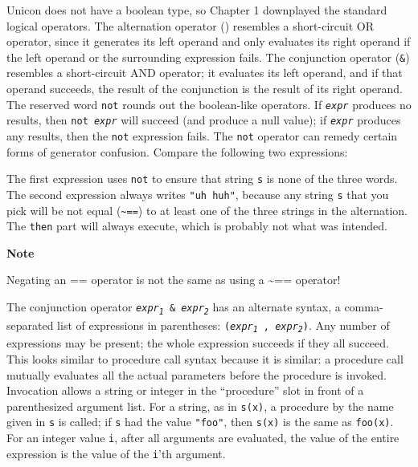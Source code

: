Unicon does not have a boolean type, so
Chapter 1 downplayed the standard logical operators. The
alternation operator
(\texttt{{\textbar}}) resembles a short-circuit OR
operator, since it generates its left operand and only evaluates its
right operand if the left operand or the surrounding expression fails.
The conjunction operator (\texttt{\&}) resembles a short-circuit
AND operator; it evaluates its left operand,
and if that operand succeeds, the result of the conjunction is the
result of its right operand. The reserved word \texttt{not} rounds out
the boolean-like operators. If \texttt{\textit{expr}} produces no
results, then \texttt{not }\texttt{\textit{expr}} will
succeed (and produce a null value); if \texttt{\textit{expr}} produces
any results, then the \texttt{not} expression fails. The \texttt{not}
operator can remedy certain forms of generator confusion. Compare the
following two expressions:


The first expression uses \texttt{not} to ensure that string \texttt{s}
is none of the three words. The second expression always writes
\texttt{"uh huh"}, because any string
\texttt{s} that you pick will be not equal (\texttt{\~{}==}) to at
least one of the three strings in the alternation. The \texttt{then}
part will always execute, which is probably not what was intended.

{\sffamily\bfseries Note}

{\sffamily
Negating an == operator is not the same as using a \~{}== operator!}

The conjunction operator
\texttt{\textit{expr}}\texttt{\textit{\textsubscript{1}}}\texttt{ \&
}\texttt{\textit{expr}}\texttt{\textit{\textsubscript{2}}} has an
alternate syntax, a comma-separated list of expressions in parentheses:
\texttt{(}\texttt{\textit{expr}}\texttt{\textit{\textsubscript{1}}}\texttt{
, }\texttt{\textit{expr}}\texttt{\textit{\textsubscript{2}}}\texttt{)}.
Any number of expressions may be present; the whole expression
succeeds if they all succeed. This looks similar to procedure call syntax
because it is similar: a procedure call mutually
evaluates all the actual parameters before the procedure is invoked.
Invocation allows a string or integer in the ``procedure'' slot
in front of a parenthesized argument
list. For a string, as in
\texttt{s(x)}, a procedure by the name given in \texttt{s} is called;
if \texttt{s} had the value \texttt{"foo"},
then \texttt{s(x)} is the same as \texttt{foo(x)}. For an integer value
\texttt{i}, after all arguments are evaluated, the value of the entire
expression is the value of the \texttt{i}'th argument.

